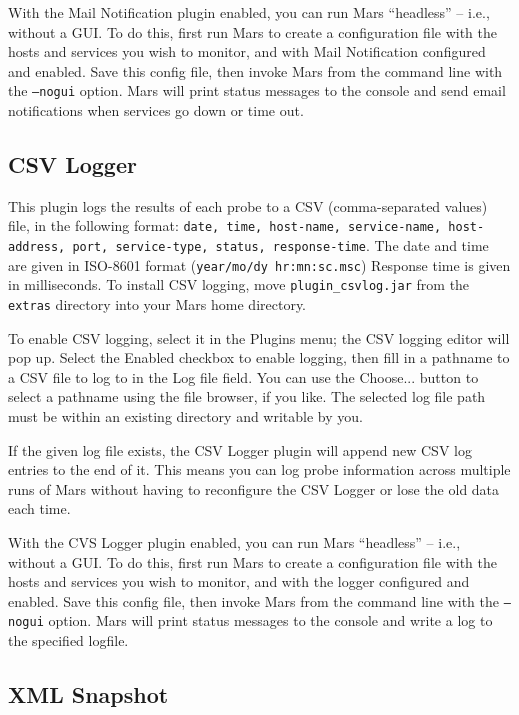 \documentclass{article}
\newcommand{\filename}[1]{{\tt #1}}
\newcommand{\cmdline}[1]{{\tt #1}}
\newcommand{\identifier}[1]{{\tt #1}}
\newcommand{\guiitem}[1]{{\sf #1}}
\begin{document}
With the Mail Notification plugin enabled, you can run Mars
``headless'' -- i.e., without a GUI. To do this, first run Mars to
create a configuration file with the hosts and services you wish to
monitor, and with Mail Notification configured and enabled. Save this
config file, then invoke Mars from the command line with the
\cmdline{--nogui} option. Mars will print status messages to the
console and send email notifications when services go down or time
out.

\subsection{CSV Logger}

This plugin logs the results of each probe to a CSV (comma-separated
values) file, in the following format: \identifier{date, time,
  host-name, service-name, host-address, port, service-type, status,
  response-time}. The date and time are given in ISO-8601 format
(\identifier{year/mo/dy hr:mn:sc.msc}) Response time is given in
milliseconds. To install CSV logging, move
\filename{plugin\_csvlog.jar} from the \filename{extras}
directory into your Mars home directory.

To enable CSV logging, select it in the \guiitem{Plugins} menu; the
CSV logging editor will pop up. Select the \guiitem{Enabled} checkbox
to enable logging, then fill in a pathname to a CSV file to log to in
the \guiitem{Log file} field. You can use the \guiitem{Choose...}
button to select a pathname using the file browser, if you like. The
selected log file path must be within an existing directory and
writable by you.

If the given log file exists, the CSV Logger plugin will append new
CSV log entries to the end of it. This means you can log probe
information across multiple runs of Mars without having to reconfigure
the CSV Logger or lose the old data each time.

With the CVS Logger plugin enabled, you can run Mars ``headless'' --
i.e., without a GUI. To do this, first run Mars to create a
configuration file with the hosts and services you wish to monitor,
and with the logger configured and enabled. Save this config file,
then invoke Mars from the command line with the \cmdline{--nogui}
option. Mars will print status messages to the console and write a log
to the specified logfile.

\subsection{XML Snapshot}
\end{document}

